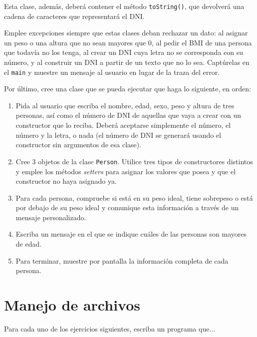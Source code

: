 \documentclass[a4paper]{article}
\newcommand{\code}[1]{\texttt{#1}}
\begin{document}
\begin{enumerate}
    Esta clase, además, deberá contener el método \code{toString()}, que devolverá una cadena de caracteres que representará el DNI.

    Emplee excepciones siempre que estas clases deban rechazar un dato: al asignar un peso o una altura que no sean mayores que 0, al pedir el BMI de una persona que todavía no los tenga, al crear un DNI cuya letra no se corresponda con su número, y al construir un DNI a partir de un texto que no lo sea. Captúrelas en el \code{main} y muestre un mensaje al usuario en lugar de la traza del error.

    Por último, cree una clase que se pueda ejecutar que haga lo siguiente, en orden:

    \begin{enumerate}
        \item Pida al usuario que escriba el nombre, edad, sexo, peso y altura de tres personas, así como el número de DNI de aquellas que vaya a crear con un constructor que lo reciba. Deberá aceptarse simplemente el número, el número y la letra, o nada (el número de DNI se generará usando el constructor sin argumentos de esa clase).
        \item Cree 3 objetos de la clase \code{Person}. Utilice tres tipos de constructores distintos y emplee los métodos \textit{setters} para asignar los valores que posea y que el constructor no haya asignado ya.
        \item Para cada persona, compruebe si está en su peso ideal, tiene sobrepeso o está por debajo de su peso ideal y comunique esta información a través de un mensaje personalizado.
        \item Escriba un mensaje en el que se indique cuáles de las personas son mayores de edad.
        \item Para terminar, muestre por pantalla la información completa de cada persona.
    \end{enumerate}

\end{enumerate}

\section{Manejo de archivos}

Para cada uno de los ejercicios siguientes, escriba un programa que...
\end{document}

